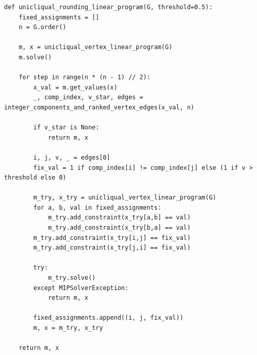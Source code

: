 \begin{lstlisting}[style=python, caption={Unicliqual Rounding Linear Program.}, label={lst::unicliqual_rounding_linear_program}]
def unicliqual_rounding_linear_program(G, threshold=0.5):
    fixed_assignments = []
    n = G.order()

    m, x = unicliqual_vertex_linear_program(G)
    m.solve()

    for step in range(n * (n - 1) // 2):
        x_val = m.get_values(x)
        _, comp_index, v_star, edges = integer_components_and_ranked_vertex_edges(x_val, n)

        if v_star is None:
            return m, x

        i, j, v, _ = edges[0]
        fix_val = 1 if comp_index[i] != comp_index[j] else (1 if v > threshold else 0)

        m_try, x_try = unicliqual_vertex_linear_program(G)
        for a, b, val in fixed_assignments:
            m_try.add_constraint(x_try[a,b] == val)
            m_try.add_constraint(x_try[b,a] == val)
        m_try.add_constraint(x_try[i,j] == fix_val)
        m_try.add_constraint(x_try[j,i] == fix_val)

        try:
            m_try.solve()
        except MIPSolverException:
            return m, x

        fixed_assignments.append((i, j, fix_val))
        m, x = m_try, x_try

    return m, x
\end{lstlisting}